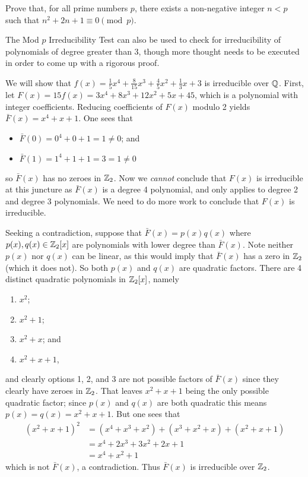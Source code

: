 \begin{exercise}
    Prove that, for all prime numbers $p$, there exists a non-negative integer $n < p$ such that $n^2 + 2n + 1 \equiv 0 \pmod{p}$.
\end{exercise}

The Mod $p$ Irreducibility Test can also be used to check for irreducibility of polynomials of degree greater than 3, though more thought needs to be executed in order to come up with a rigorous proof.

\begin{example}\label{example-x^4+x+1-is-irreducible-over-Z2}
    We will show that $f(x) = \frac15x^4 + \frac8{15}x^3 + \frac45x^2 + \frac13x + 3$ is irreducible over $\mathbb{Q}$. First, let $F(x) = 15f(x) = 3x^4 + 8x^3 + 12x^2 + 5x + 45$, which is a polynomial with integer coefficients. Reducing coefficients of $F(x)$ modulo 2 yields $\bar{F}(x) = x^4 + x + 1$. One sees that
    \begin{itemize}
        \item $\bar{F}(0) = 0^4 + 0 + 1 = 1 \neq 0$; and
        \item $\bar{F}(1) = 1^4 + 1 + 1 = 3 = 1 \neq 0$
    \end{itemize}
    so $\bar{F}(x)$ has no zeroes in $\mathbb{Z}_2$. Now we \textit{cannot} conclude that $F(x)$ is irreducible at this juncture as $\bar{F}(x)$ is a degree 4 polynomial, and  only applies to degree 2 and degree 3 polynomials. We need to do more work to conclude that $F(x)$ is irreducible.

    Seeking a contradiction, suppose that $\bar{F}(x) = p(x)q(x)$ where $p(x), q(x) \in \mathbb{Z}_2[x]$ are polynomials with lower degree than $\bar{F}(x)$. Note neither $p(x)$ nor $q(x)$ can be linear, as this would imply that $\bar{F}(x)$ has a zero in $\mathbb{Z}_2$ (which it does not). So both $p(x)$ and $q(x)$ are quadratic factors. There are 4 distinct quadratic polynomials in $\mathbb{Z}_2[x]$, namely
    \begin{enumerate}
        \item $x^2$;
        \item $x^2 + 1$;
        \item $x^2 + x$; and
        \item $x^2 + x + 1$,
    \end{enumerate}
    and clearly options 1, 2, and 3 are not possible factors of $\bar{F}(x)$ since they clearly have zeroes in $\mathbb{Z}_2$. That leaves $x^2 + x + 1$ being the only possible quadratic factor; since $p(x)$ and $q(x)$ are both quadratic this means $p(x) = q(x) = x^2 + x + 1$. But one sees that
    \begin{align*}
        (x^2 + x + 1)^2 &= (x^4 + x^3 + x^2) + (x^3 + x^2 + x) + (x^2 + x + 1)\\
        &= x^4 + 2x^3 + 3x^2 + 2x + 1\\
        &= x^4 + x^2 + 1
    \end{align*}
    which is not $\bar{F}(x)$, a contradiction. Thus $\bar{F}(x)$ is irreducible over $\mathbb{Z}_2$.


\end{example}

